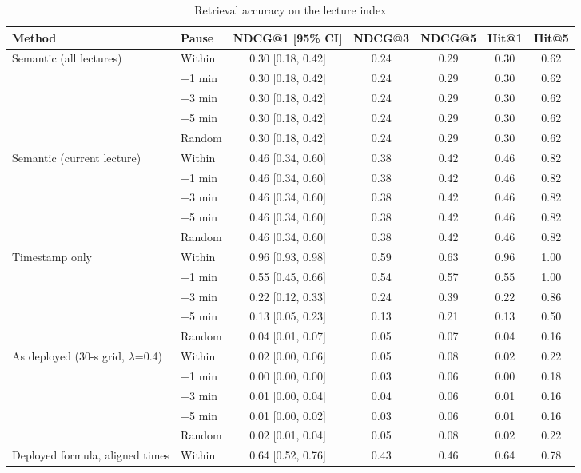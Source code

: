 \begin{table}[!htbp]
\centering
\caption{Retrieval accuracy on the lecture index}
\label{tab:sup_retrieval}
\small
\begin{tabular}{llccccc}
\toprule
\textbf{Method} & \textbf{Pause} & \textbf{NDCG@1 [95\% CI]} & \textbf{NDCG@3} & \textbf{NDCG@5} & \textbf{Hit@1} & \textbf{Hit@5} \\
\midrule
Semantic (all lectures) & Within & 0.30 [0.18, 0.42] & 0.24 & 0.29 & 0.30 & 0.62 \\
 & +1 min & 0.30 [0.18, 0.42] & 0.24 & 0.29 & 0.30 & 0.62 \\
 & +3 min & 0.30 [0.18, 0.42] & 0.24 & 0.29 & 0.30 & 0.62 \\
 & +5 min & 0.30 [0.18, 0.42] & 0.24 & 0.29 & 0.30 & 0.62 \\
 & Random & 0.30 [0.18, 0.42] & 0.24 & 0.29 & 0.30 & 0.62 \\
\addlinespace
Semantic (current lecture) & Within & 0.46 [0.34, 0.60] & 0.38 & 0.42 & 0.46 & 0.82 \\
 & +1 min & 0.46 [0.34, 0.60] & 0.38 & 0.42 & 0.46 & 0.82 \\
 & +3 min & 0.46 [0.34, 0.60] & 0.38 & 0.42 & 0.46 & 0.82 \\
 & +5 min & 0.46 [0.34, 0.60] & 0.38 & 0.42 & 0.46 & 0.82 \\
 & Random & 0.46 [0.34, 0.60] & 0.38 & 0.42 & 0.46 & 0.82 \\
\addlinespace
Timestamp only & Within & 0.96 [0.93, 0.98] & 0.59 & 0.63 & 0.96 & 1.00 \\
 & +1 min & 0.55 [0.45, 0.66] & 0.54 & 0.57 & 0.55 & 1.00 \\
 & +3 min & 0.22 [0.12, 0.33] & 0.24 & 0.39 & 0.22 & 0.86 \\
 & +5 min & 0.13 [0.05, 0.23] & 0.13 & 0.21 & 0.13 & 0.50 \\
 & Random & 0.04 [0.01, 0.07] & 0.05 & 0.07 & 0.04 & 0.16 \\
\addlinespace
As deployed (30-s grid, $\lambda$=0.4) & Within & 0.02 [0.00, 0.06] & 0.05 & 0.08 & 0.02 & 0.22 \\
 & +1 min & 0.00 [0.00, 0.00] & 0.03 & 0.06 & 0.00 & 0.18 \\
 & +3 min & 0.01 [0.00, 0.04] & 0.04 & 0.06 & 0.01 & 0.16 \\
 & +5 min & 0.01 [0.00, 0.02] & 0.03 & 0.06 & 0.01 & 0.16 \\
 & Random & 0.02 [0.01, 0.04] & 0.05 & 0.08 & 0.02 & 0.22 \\
\addlinespace
Deployed formula, aligned times & Within & 0.64 [0.52, 0.76] & 0.43 & 0.46 & 0.64 & 0.78 \\

\end{tabular}
\end{table}
